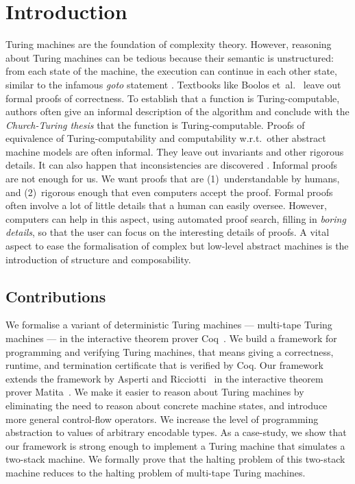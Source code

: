 \chapter{Introduction}
\label{chap:intro}

Turing machines are the foundation of complexity theory.  However, reasoning about Turing machines can be tedious because their semantic is
unstructured: from each state of the machine, the execution can continue in each other state, similar to the infamous \textit{goto} statement
\cite{dijkstra2002go}.  Textbooks like Boolos et~al.~\cite{boolos2007computability} leave out formal proofs of correctness.  To establish that a
function is Turing-computable, authors often give an informal description of the algorithm and conclude with the \textit{Church-Turing thesis} that
the function is Turing-computable.  Proofs of equivalence of Turing-computability and computability w.r.t.\ other abstract machine models are often
informal.  They leave out invariants and other rigorous details.  It can also happen that inconsistencies are discovered
\cite{Xu:2013:MTM:2529315.2529331}.  Informal proofs are not enough for us.  We want proofs that are (1)~understandable by humans, and (2)~rigorous
enough that even computers accept the proof.  Formal proofs often involve a lot of little details that a human can easily oversee.  However, computers
can help in this aspect, using automated proof search, filling in \textit{boring details}, so that the user can focus on the interesting details of
proofs.  A vital aspect to ease the formalisation of complex but low-level abstract machines is the introduction of structure and composability.


\section{Contributions}
\label{sec:contributions}

We formalise a variant of deterministic Turing machines --- multi-tape Turing machines --- in the interactive theorem prover Coq~\cite{Coq}.  We build
a framework for programming and verifying Turing machines, that means giving a correctness, runtime, and termination certificate that is verified by
Coq.  Our framework extends the framework by Asperti and Ricciotti~\cite{asperti2015} in the interactive theorem prover
Matita~\cite{asperti2011matita}.  We make it easier to reason about Turing machines by eliminating the need to reason about concrete machine states,
and introduce more general control-flow operators.  We increase the level of programming abstraction to values of arbitrary encodable types.  As a
case-study, we show that our framework is strong enough to implement a Turing machine that simulates a two-stack machine.  We formally prove that the
halting problem of this two-stack machine reduces to the halting problem of multi-tape Turing machines.

